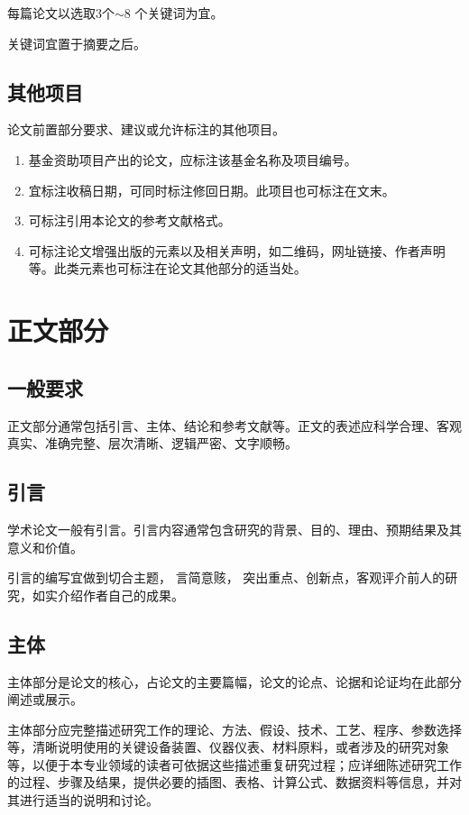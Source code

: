 每篇论文以选取3个$\sim$8 个关键词为宜。

关键词宜置于摘要之后。

\subsection{其他项目}
论文前置部分要求、建议或允许标注的其他项目。

\begin{enumerate}
\item 基金资助项目产出的论文，应标注该基金名称及项目编号。

\item 宜标注收稿日期，可同时标注修回日期。此项目也可标注在文末。

\item  可标注引用本论文的参考文献格式。

\item  可标注论文增强出版的元素以及相关声明，如二维码，网址链接、作者声明等。此类元素也可标注在论文其他部分的适当处。
\end{enumerate}
\section{正文部分}
\subsection{一般要求}
正文部分通常包括引言、主体、结论和参考文献等。正文的表述应科学合理、客观真实、准确完整、层次清晰、逻辑严密、文字顺畅。

\subsection{引言}
学术论文一般有引言。引言内容通常包含研究的背景、目的、理由、预期结果及其意义和价值。

引言的编写宜做到切合主题， 言简意赅， 突出重点、创新点，客观评介前人的研究，如实介绍作者自己的成果。

\subsection{主体}
主体部分是论文的核心，占论文的主要篇幅，论文的论点、论据和论证均在此部分阐述或展示。

主体部分应完整描述研究工作的理论、方法、假设、技术、工艺、程序、参数选择等，清晰说明使用的关键设备装置、仪器仪表、材料原料，或者涉及的研究对象等，以便于本专业领域的读者可依据这些描述重复研究过程；应详细陈述研究工作的过程、步骤及结果，提供必要的插图、表格、计算公式、数据资料等信息，并对其进行适当的说明和讨论。

